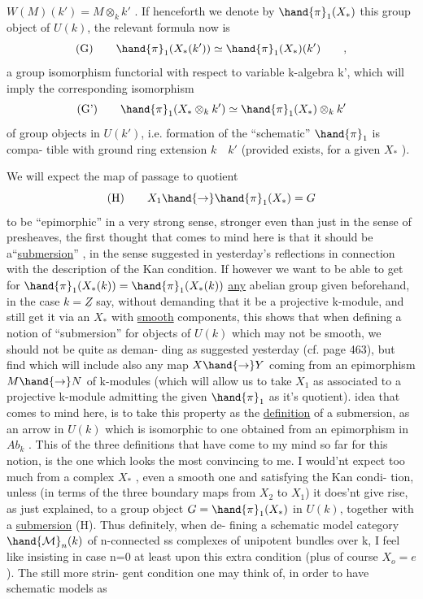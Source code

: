 
$W(M)(k') = M\otimes_k k'$ . If henceforth we denote by $\hand{\pi}_1(X_*)$ this group
object of $U(k)$, the relevant formula now is
\[ \text{(G)} \qquad \hand{\pi}_1(X_*(k'))\simeq \hand{\pi}_1(X_*)(k') \qquad , \]
a group isomorphism functorial with respect to variable k-algebra k',
which will imply the corresponding isomorphism
\[ \text{(G')} \qquad \hand{\pi}_1(X_*\otimes_k k')\simeq \hand{\pi}_1(X_*)\otimes_k k' \]
of group objects in $U(k')$, i.e. formation of the ``schematic'' $\hand{\pi}_1$ is compa-%
tible with ground ring extension $k \quad k'$ (provided  exists, for a given
$X_*$ ).

We will expect  the map of passage to quotient
\[ \text{(H)} \qquad X_1\hand{\to}\hand{\pi}_1(X_*) = G \]
to be ``epimorphic'' in a very strong sense, stronger even than just in
the sense of presheaves, the first thought that comes to mind here is
that it should be a``\uline{submersion}'' , in the sense suggested in yesterday's
reflections in connection with the description of the Kan condition. If
however we want to be able to get for $\hand{\pi}_1(X_*(k)) = \hand{\pi}_1(X_*(k))$ \uline{any} abelian
group given beforehand, in the case $k=\underline{Z}$ say, without demanding that it
be a projective k-module, and still get it via an $X_*$ with \uline{smooth}
components, this shows that when defining a notion of ``submersion'' for
objects of $U(k)$ which may not be smooth, we should not be quite as deman-%
ding  as suggested yesterday (cf. page 463), but find
  which will include also any map $X \hand{\to} Y$ coming from an epimorphism
$M\hand{\to} N$ of k-modules (which will allow us to take $X_1$ as associated to
a projective k-module admitting the given $\hand{\pi}_1$ as it's quotient). 
idea that comes to mind here, is to take this property as the \uline{definition}
of a submersion, as an arrow in $U(k)$ which  is isomorphic to
one obtained from an epimorphism in $Ab_k$ . This\hand{,}  of the
three definitions that have come to my mind so far for this notion, is
the one which looks the most convincing to me. I would'nt expect too
much from a complex $X_*$ , even a smooth one and satisfying the Kan condi-%
tion, unless (in terms of the three boundary maps from $X_2$ to $X_1$) it
does'nt give rise, as just explained, to a group object $G = \hand{\pi}_1(X_*)$
in $U(k)$, together with a \uline{submersion} (H). Thus definitely, when de-%
fining a schematic model category $\hand{\mathcal{M}}_n(k)$ of n-connected ss complexes
of unipotent bundles over k, I feel like insisting in case n=0 at least
upon this extra condition (plus of course $X_o = e$). The still more strin-%
gent condition one may think of, in order to have schematic models as

